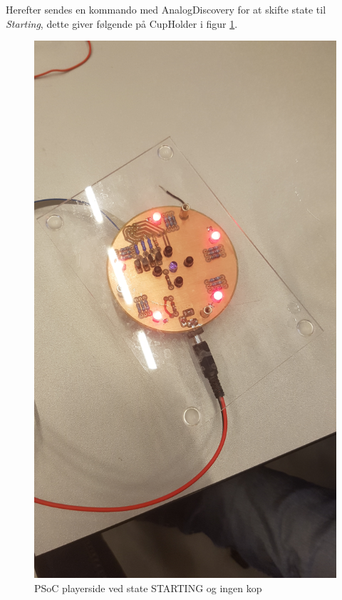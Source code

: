 \documentclass[Integrationstest/Integrationstest_main.tex]{subfiles}
\begin{document}
Herefter sendes en kommando med AnalogDiscovery for at skifte state til \textit{Starting}, dette giver følgende på CupHolder i figur \ref{fig:int_playerside_starting_no_cup}.
\begin{figure}[H]
    \centering
    \includegraphics[width=\textwidth]{Integrationstest/Integrationstest_PlayerSide/graphics/CupSensorInt/STARTING_no_cup.jpg}
    \caption{PSoC playerside ved state STARTING og ingen kop}
    \label{fig:int_playerside_starting_no_cup}
\end{figure}
\end{document}
